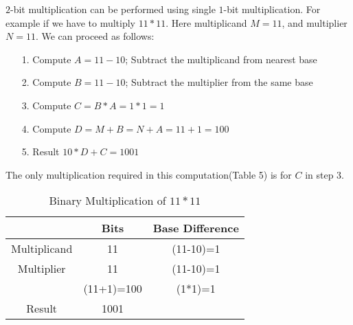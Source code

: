 \documentclass[conference]{IEEEtran}
\begin{document}
$2$-bit multiplication can be performed using single $1$-bit multiplication. For example if we have to multiply $11*11$. Here multiplicand $M=11$, and multiplier $N=11$. We can proceed as follows:
\begin{enumerate}
 \item[1.] Compute $A = 11-10$; Subtract the multiplicand from nearest base 
 \item[2.] Compute $B = 11-10$; Subtract the multiplier from the same base
 \item[3.] Compute $C = B*A=1*1=1 $
 \item[4.] Compute $D = M+B=N+A=11+1=100$ 
 \item[5.] Result  $10*D + C = 1001$
\end{enumerate}
The only multiplication required in this computation(Table 5) is for $C$ in step 3.
\begin{table}[ht]
\renewcommand{\arraystretch}{1.3}
\caption{Binary Multiplication of $11*11$}
\label{table 5}
\begin{center}
\begin{tabular}{|c| c| c| } 
\hline
 & Bits & Base Difference    \\ [1ex] \hline\hline 
Multiplicand & 11 & (11-10)=1   \\ \hline
Multiplier & 11 & (11-10)=1  \\ \hline
 & (11+1)=100 & (1*1)=1  \\ \hline
Result & 1001 &   \\ [1ex] \hline

\end{tabular} 
\end{center}
\end{table} 
\end{document}
